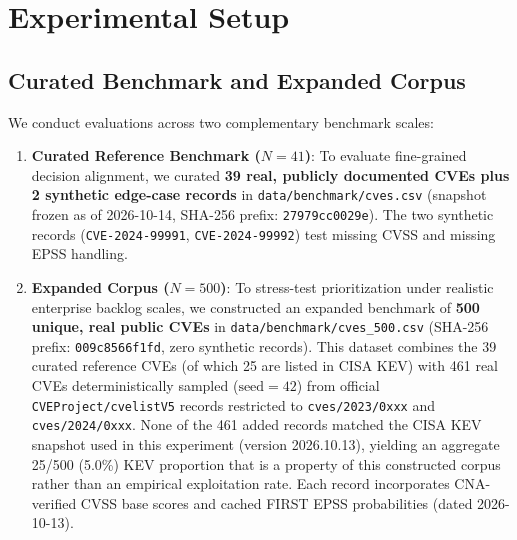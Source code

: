 \documentclass[conference]{IEEEtran}
\begin{document}
\section{Experimental Setup}

\subsection{Curated Benchmark and Expanded Corpus}
We conduct evaluations across two complementary benchmark scales:
\begin{enumerate}
    \item \textbf{Curated Reference Benchmark ($N=41$)}: To evaluate fine-grained decision alignment, we curated \textbf{39 real, publicly documented CVEs plus 2 synthetic edge-case records} in \texttt{data/benchmark/cves.csv} (snapshot frozen as of 2026-10-14, SHA-256 prefix: \texttt{27979cc0029e}). The two synthetic records (\texttt{CVE-2024-99991}, \texttt{CVE-2024-99992}) test missing CVSS and missing EPSS handling.
    \item \textbf{Expanded Corpus ($N=500$)}: To stress-test prioritization under realistic enterprise backlog scales, we constructed an expanded benchmark of \textbf{500 unique, real public CVEs} in \texttt{data/benchmark/cves\_500.csv} (SHA-256 prefix: \texttt{009c8566f1fd}, zero synthetic records). This dataset combines the 39 curated reference CVEs (of which 25 are listed in CISA KEV) with 461 real CVEs deterministically sampled ($\text{seed}=42$) from official \texttt{CVEProject/cvelistV5} records restricted to \texttt{cves/2023/0xxx} and \texttt{cves/2024/0xxx}. None of the 461 added records matched the CISA KEV snapshot used in this experiment (version 2026.10.13), yielding an aggregate 25/500 (5.0\%) KEV proportion that is a property of this constructed corpus rather than an empirical exploitation rate. Each record incorporates CNA-verified CVSS base scores and cached FIRST EPSS probabilities (dated 2026-10-13).
\end{enumerate}
\end{document}
